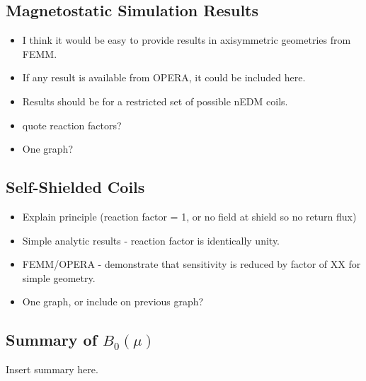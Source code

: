 \documentclass[review]{elsarticle}
\begin{document}
\subsection{Magnetostatic Simulation Results}

\begin{itemize}
\item I think it would be easy to provide results in axisymmetric
  geometries from FEMM.
\item If any result is available from OPERA, it could be included here.
\item Results should be for a restricted set of possible nEDM coils.
\item quote reaction factors?
\item One graph?  %
\end{itemize}

\subsection{Self-Shielded Coils}

\begin{itemize}
\item Explain principle (reaction factor = 1, or no field at shield so
  no return flux)
\item Simple analytic results - reaction factor is identically unity.
\item FEMM/OPERA - demonstrate that sensitivity is reduced by factor
  of XX for simple geometry.
\item One graph, or include on previous graph?
\end{itemize}

\subsection{Summary of $B_0(\mu)$}

Insert summary here.
\end{document}
